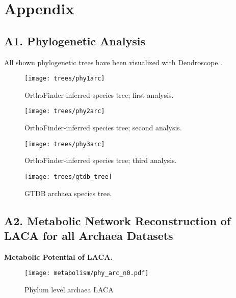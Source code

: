 \newpage
\appendix
\section{Appendix}
\setcounter{figure}{0}
\setcounter{table}{0}
\noappendixindent

\subsection*{A1. Phylogenetic Analysis}
\normalsize
All shown phylogenetic trees have been visualized with Dendroscope \cite{huson2012}.

\begin{figure}[h!tbp]
    \centering
    \renewcommand{\thefigure}{A\arabic{figure}}
    \texttt{[image: trees/phy1arc]}
    \caption{OrthoFinder-inferred species tree; first analysis.}
    \label{phylum_trees1}
\end{figure}

\begin{figure}[h!tbp]
    \centering
    \renewcommand{\thefigure}{A\arabic{figure}}
    \texttt{[image: trees/phy2arc]}
    \caption{OrthoFinder-inferred species tree; second analysis.}
    \label{phylum_trees2}
\end{figure}

\begin{figure}[h!tbp]
    \centering
    \renewcommand{\thefigure}{A\arabic{figure}}
    \texttt{[image: trees/phy3arc]}
    \caption{OrthoFinder-inferred species tree; third analysis.}
    \label{phylum_trees3}
\end{figure}

\begin{figure}[h!tbp]
    \centering
    \renewcommand{\thefigure}{A\arabic{figure}}
    \texttt{[image: trees/gtdb\_tree]}
    \caption{GTDB archaea species tree.}
    \label{gtdb_tree}
\end{figure}

\subsection*{A2. Metabolic Network Reconstruction of LACA for all Archaea Datasets}
\textbf{Metabolic Potential of LACA.}

\begin{figure}[H]
    \centering
    \texttt{[image: metabolism/phy\_arc\_n0.pdf]}
    \caption{Phylum level archaea LACA}
    \label{phy4arc_metnet}
\end{figure}   


